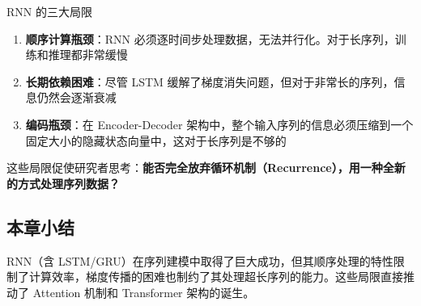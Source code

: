 \begin{warningbox}{RNN 的三大局限}
\begin{enumerate}
    \item \textbf{顺序计算瓶颈}：RNN 必须逐时间步处理数据，无法并行化。对于长序列，训练和推理都非常缓慢
    \item \textbf{长期依赖困难}：尽管 LSTM 缓解了梯度消失问题，但对于非常长的序列，信息仍然会逐渐衰减
    \item \textbf{编码瓶颈}：在 Encoder-Decoder 架构中，整个输入序列的信息必须压缩到一个固定大小的隐藏状态向量中，这对于长序列是不够的
\end{enumerate}
\end{warningbox}

这些局限促使研究者思考：\textbf{能否完全放弃循环机制（Recurrence），用一种全新的方式处理序列数据？}

\subsection{本章小结}

RNN（含 LSTM/GRU）在序列建模中取得了巨大成功，但其顺序处理的特性限制了计算效率，梯度传播的困难也制约了其处理超长序列的能力。这些局限直接推动了 Attention 机制和 Transformer 架构的诞生。

\newpage
